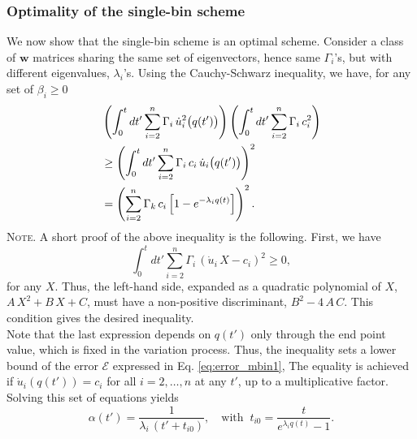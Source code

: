 \documentclass[reprint]{revtex4-1}
\newcommand{\note}[1]{{\color{DarkGreen}\footnotesize \textsc{Note.} #1}}
\begin{document}
%
%



\subsubsection{\label{sec:optWL}
Optimality of the single-bin scheme}



We now show
that the single-bin scheme
is an optimal scheme.
%
Consider a class of $\mathbf w$ matrices
sharing the same set of eigenvectors,
hence same $\Gamma_i$'s,
but with different eigenvalues, $\lambda_i$'s.
%
Using the Cauchy-Schwarz inequality, we have,
for any set of $\beta_i \ge 0$
%
\begin{align}
&
\left(
  \int_0^t dt'
    \sum_{i = 2}^n
      \Gamma_i \, \dot u_i^2\bigl( q(t') \bigr)
\right)
%
\left(
  \int_0^t dt'
    \sum_{i = 2}^n
      \Gamma_i \, c_i^2
\right)
%
\notag
\\
&
\ge
\left(
  \int_0^t dt'
    \sum_{i = 2}^n
      \Gamma_i \, c_i \, \dot u_i\bigl( q(t') \bigr)
\right)^2
\notag
\\
&
=
\left(
  \sum_{i = 2}^n \Gamma_k \, c_i
    \left[
      1 - e^{ -\lambda_i q(t) }
    \right]
\right)^2.
\notag
\end{align}
%
\note{A short proof of the above inequality
  is the following.
  First, we have
$$
\int_0^t
  dt' \sum_{i = 2}^n \Gamma_i \,
    \left( \dot u_i \, X - c_i \right)^2
\ge 0,
$$
  for any $X$.
  Thus, the left-hand side,
  expanded as a quadratic polynomial of $X$,
  $A \, X^2 + B \, X + C$,
  must have a non-positive discriminant,
  $B^2 - 4 \, A \, C$.
  This condition gives the desired inequality.
  \\%
}
%
Note that the last expression depends on
$q(t')$ only through the end point value,
which is fixed in the variation process.
%
Thus, the inequality sets a lower bound
of the error $\mathcal E$
expressed in Eq. \eqref{eq:error_mbin1},
%
The equality is achieved
if $\dot u_i\left( q(t') \right) = c_i$
for all $i = 2, \dots, n$ at any $t'$,
up to a multiplicative factor.
%
Solving this set of equations yields
$$
\alpha(t') = \frac{              1              }
                  { \lambda_i \, (t' + t_{i0} ) },
\quad
\mathrm{with\;\;}
t_{i0} = \frac{             t            }
              { e^{ \lambda_i q(t) } - 1 }.
$$
\end{document}
